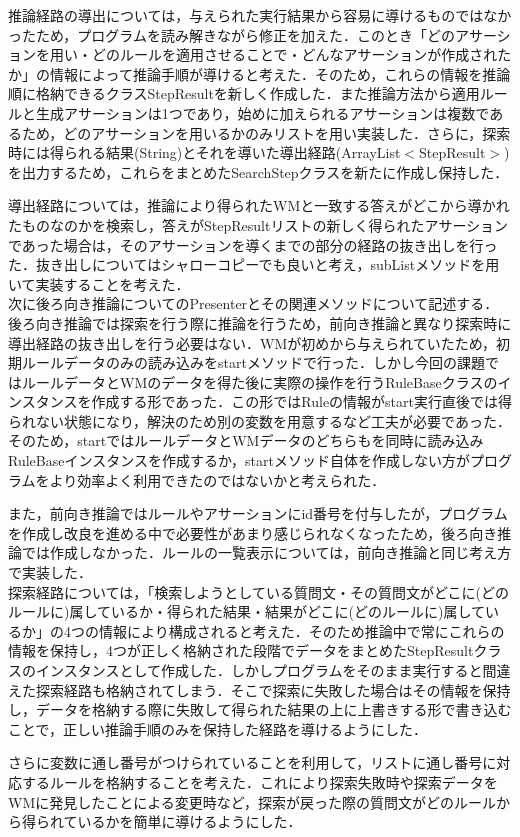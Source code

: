 \documentclass[12pt]{jarticle}
\begin{document}
推論経路の導出については，与えられた実行結果から容易に導けるものではなかったため，プログラムを読み解きながら修正を加えた．このとき「どのアサーションを用い・どのルールを適用させることで・どんなアサーションが作成されたか」の情報によって推論手順が導けると考えた．そのため，これらの情報を推論順に格納できるクラスStepResultを新しく作成した．また推論方法から適用ルールと生成アサーションは1つであり，始めに加えられるアサーションは複数であるため，どのアサーションを用いるかのみリストを用い実装した．さらに，探索時には得られる結果(String)とそれを導いた導出経路(ArrayList$<$StepResult$>$)を出力するため，これらをまとめたSearchStepクラスを新たに作成し保持した．\par
導出経路については，推論により得られたWMと一致する答えがどこから導かれたものなのかを検索し，答えがStepResultリストの新しく得られたアサーションであった場合は，そのアサーションを導くまでの部分の経路の抜き出しを行った．抜き出しについてはシャローコピーでも良いと考え，subListメソッドを用いて実装することを考えた．\\

次に後ろ向き推論についてのPresenterとその関連メソッドについて記述する．\\

後ろ向き推論では探索を行う際に推論を行うため，前向き推論と異なり探索時に導出経路の抜き出しを行う必要はない．WMが初めから与えられていたため，初期ルールデータのみの読み込みをstartメソッドで行った．しかし今回の課題ではルールデータとWMのデータを得た後に実際の操作を行うRuleBaseクラスのインスタンスを作成する形であった．この形ではRuleの情報がstart実行直後では得られない状態になり，解決のため別の変数を用意するなど工夫が必要であった．そのため，startではルールデータとWMデータのどちらもを同時に読み込みRuleBaseインスタンスを作成するか，startメソッド自体を作成しない方がプログラムをより効率よく利用できたのではないかと考えられた．\par
また，前向き推論ではルールやアサーションにid番号を付与したが，プログラムを作成し改良を進める中で必要性があまり感じられなくなったため，後ろ向き推論では作成しなかった．ルールの一覧表示については，前向き推論と同じ考え方で実装した．\\

探索経路については，「検索しようとしている質問文・その質問文がどこに(どのルールに)属しているか・得られた結果・結果がどこに(どのルールに)属しているか」の4つの情報により構成されると考えた．そのため推論中で常にこれらの情報を保持し，4つが正しく格納された段階でデータをまとめたStepResultクラスのインスタンスとして作成した．しかしプログラムをそのまま実行すると間違えた探索経路も格納されてしまう．そこで探索に失敗した場合はその情報を保持し，データを格納する際に失敗して得られた結果の上に上書きする形で書き込むことで，正しい推論手順のみを保持した経路を導けるようにした．\par
さらに変数に通し番号がつけられていることを利用して，リストに通し番号に対応するルールを格納することを考えた．これにより探索失敗時や探索データをWMに発見したことによる変更時など，探索が戻った際の質問文がどのルールから得られているかを簡単に導けるようにした．\\
\end{document}
